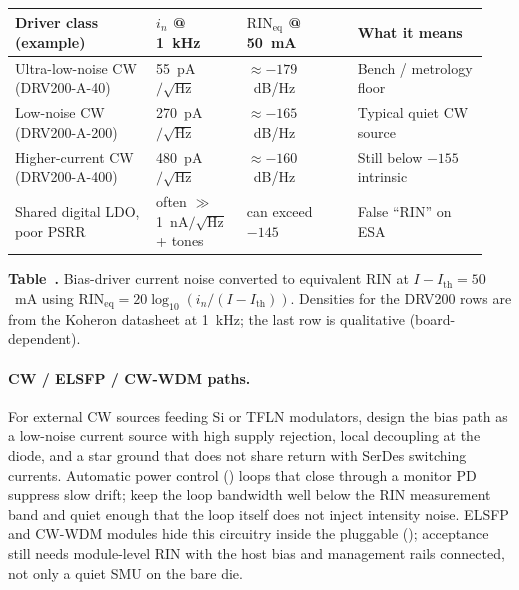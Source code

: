 \begin{table}[ht]
\label{tab:laser-driver-noise}%
\centering
\setlength{\tabcolsep}{4pt}%
\footnotesize
\renewcommand{\arraystretch}{1.25}%
\begin{tabular}{@{}p{0.28\linewidth}p{0.18\linewidth}p{0.22\linewidth}p{0.26\linewidth}@{}}
\toprule
Driver class (example) & $i_n$ @ 1~kHz & $\mathrm{RIN}_{\mathrm{eq}}$ @ 50~mA & What it means \\
\midrule
Ultra-low-noise CW (DRV200-A-40) & 55~pA$/\sqrt{\mathrm{Hz}}$ & $\approx-179$~dB/Hz & Bench / metrology floor \\
\addlinespace[1.5em]
Low-noise CW (DRV200-A-200) & 270~pA$/\sqrt{\mathrm{Hz}}$ & $\approx-165$~dB/Hz & Typical quiet CW source \\
\addlinespace[1.5em]
Higher-current CW (DRV200-A-400) & 480~pA$/\sqrt{\mathrm{Hz}}$ & $\approx-160$~dB/Hz & Still below $-155$ intrinsic \\
\addlinespace[1.5em]
Shared digital LDO, poor PSRR & often $\gg$1~nA$/\sqrt{\mathrm{Hz}}$ + tones & can exceed $-145$ & False ``RIN'' on ESA \\
\bottomrule
\end{tabular}
\par\medskip
{\raggedright\footnotesize\textbf{Table~\thetable.} Bias-driver current noise converted to
equivalent RIN at $I-I_\mathrm{th}=50$~mA using
$\mathrm{RIN}_{\mathrm{eq}}=20\log_{10}(i_n/(I-I_\mathrm{th}))$. Densities for the
DRV200 rows are from the Koheron datasheet at 1~kHz; the last
row is qualitative (board-dependent).\par}
\end{table}

\paragraph{CW / ELSFP / CW-WDM paths.}
For external CW sources feeding Si or TFLN modulators, design the bias path as a
low-noise current source with high supply rejection, local decoupling at the diode,
and a star ground that does not share return with SerDes switching currents.
Automatic power control () loops that close through a monitor PD
suppress slow drift; keep the loop bandwidth well below the RIN measurement band
and quiet enough that the loop itself does not inject intensity noise. ELSFP and
CW-WDM modules hide this circuitry inside the pluggable
(); acceptance still needs module-level RIN with
the host bias and management rails connected, not only a quiet SMU on the bare die.

